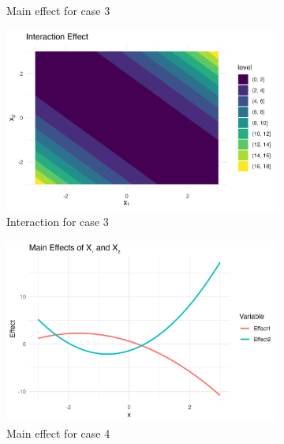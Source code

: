 \begin{figure}[htpb]
\begin{subfigure}[t]{0.49\textwidth}
        \caption{Main effect for case 3}
    \end{subfigure}%
    \hfill
    \begin{subfigure}[t]{0.49\textwidth}
        \includegraphics[width=\textwidth]{images/full_a1m20_a2m20_a11p10_a22m10_a12p10_rhom10_interaction.png}
        \caption{Interaction for case 3}
    \end{subfigure}
    \begin{subfigure}[t]{0.49\textwidth}
        \includegraphics[width=\textwidth]{images/full_a1m20_a2p20_a11m10_a22p10_a12m10_rhom05_main.png}
        \caption{Main effect for case 4}
    \end{subfigure}%
    \hfill
    \begin{subfigure}[t]{0.49\textwidth}

\end{subfigure}
\end{figure}
